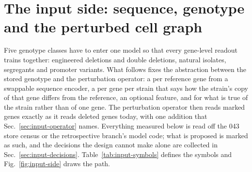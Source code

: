
\section{The input side: sequence, genotype and the perturbed cell graph}
\label{sec:input}

Five genotype classes have to enter one model so that every gene-level readout trains
together: engineered deletions and double deletions, natural isolates, segregants and
promoter variants. What follows fixes the abstraction between the stored genotype and
the perturbation operator: a  per reference gene from a swappable
sequence encoder, a  per gene per strain that says how the strain's
copy of that gene differs from the reference, an optional  feature, and
 for what is true of the strain rather than of one gene. The
perturbation operator then reads marked genes exactly as it reads deleted genes today,
with one addition that Sec.~\ref{sec:input-operator} names. Everything measured below
is read off the 043 store census or the retrospective branch's model code; what is
proposed is marked as such, and the decisions the design cannot make alone are collected
in Sec.~\ref{sec:input-decisions}. Table~\ref{tab:input-symbols} defines the symbols and
Fig.~\ref{fig:input-side} draws the path.

